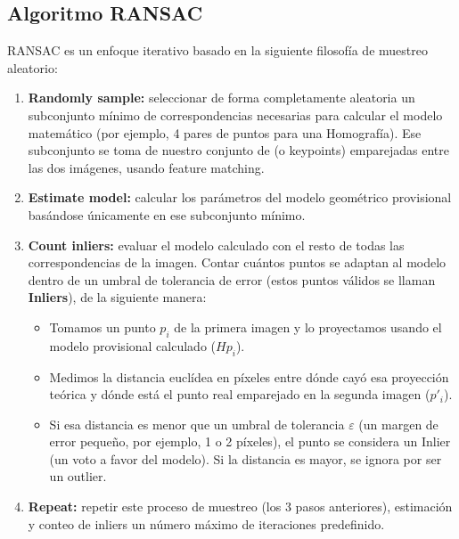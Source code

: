 \subsection{Algoritmo RANSAC}
\noindent
RANSAC es un enfoque iterativo basado en la siguiente filosofía de muestreo aleatorio:
\begin{enumerate}
    \item \textbf{Randomly sample:} seleccionar de forma completamente aleatoria un subconjunto mínimo de correspondencias necesarias para calcular el modelo matemático (por ejemplo, 4 pares de puntos para una Homografía). Ese subconjunto se toma de nuestro conjunto de  (o keypoints) emparejadas entre las dos imágenes, usando feature matching.
    \item \textbf{Estimate model:} calcular los parámetros del modelo geométrico provisional basándose únicamente en ese subconjunto mínimo.
    \item \textbf{Count inliers:} evaluar el modelo calculado con el resto de todas las correspondencias de la imagen. Contar cuántos puntos se adaptan al modelo dentro de un umbral de tolerancia de error (estos puntos válidos se llaman \textbf{Inliers}), de la siguiente manera:
    \begin{itemize}
        \item Tomamos un punto $p_i$ de la primera imagen y lo proyectamos usando el modelo provisional calculado ($H p_i$).
        \item Medimos la distancia euclídea en píxeles entre dónde cayó esa proyección teórica y dónde está el punto real emparejado en la segunda imagen ($p'_i$).
        \item Si esa distancia es menor que un umbral de tolerancia $\varepsilon$ (un margen de error pequeño, por ejemplo, 1 o 2 píxeles), el punto se considera un Inlier (un voto a favor del modelo). Si la distancia es mayor, se ignora por ser un outlier.
    \end{itemize}

    \item \textbf{Repeat:} repetir este proceso de muestreo (los 3 pasos anteriores), estimación y conteo de inliers un número máximo de iteraciones predefinido. \\
    

\end{enumerate}
